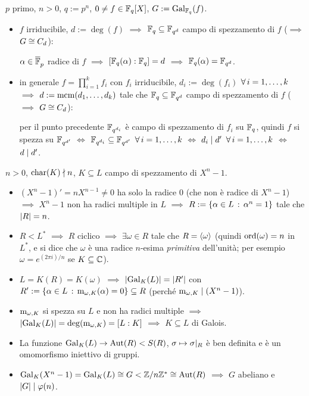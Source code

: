 $p$ primo, $n>0$, $q:=p^n$, $0\ne f\in\F_q[X]$, $G:=\Gal[\F_q]{f}$.
\begin{itemize}
\item $f$ irriducibile, $d:=\deg(f)$ $\implies$ $\F_q\subseteq\F_{q^d}$ campo di spezzamento di $f$ ($\implies$ $G\iso C_d$):

$\alpha\in\calg{\F}_p$ radice di $f$ $\implies$ $[\F_q(\alpha):\F_q]=d$ $\implies$ $\F_q(\alpha)=\F_{q^d}$.
\item in generale $f=\prod_{i=1}^kf_i$ con $f_i$ irriducibile, $d_i:=\deg(f_i)$ $\all i=1,\dots,k$ $\implies$ $d:=\mcm(d_1,\dots,d_k)$ tale che $\F_q\subseteq\F_{q^d}$ campo di spezzamento di $f$ ($\implies$ $G\iso C_d$):

per il punto precedente $\F_{q^{d_i}}$ è campo di spezzamento di $f_i$ su $\F_q$, quindi $f$ si spezza su $\F_{q^{d'}}$ $\iff$ $\F_{q^{d_i}}\subseteq\F_{q^{d'}}$ $\all i=1,\dots,k$ $\iff$ $d_i\dvd d'$ $\all i=1,\dots,k$ $\iff$ $d\dvd d'$.
\end{itemize}




$n>0$, $\car(K)\ndvd n$, $K\subseteq L$ campo di spezzamento di $X^n-1$.
\begin{itemize}
\item $(X^n-1)'=nX^{n-1}\ne0$ ha solo la radice $0$ (che non è radice di $X^n-1$) $\implies$ $X^n-1$ non ha radici multiple in $L$ $\implies$ $R:=\{\alpha\in L\st\alpha^n=1\}$ tale che $\card{R}=n$.
\item $R<L^*$ $\implies$ $R$ ciclico $\implies$ $\exi\omega\in R$ tale che $R=\gen{\omega}$ (quindi $\ord(\omega)=n$ in $L^*$, e si dice che $\omega$ è una radice $n$-esima {\em primitiva} dell'unit\`a; per esempio $\omega=e^{(2\pi i)/n}$ se $K\subseteq\C$).
\item $L=K(R)=K(\omega)$ $\implies$ $\card{\Gal[K]{L}}=\card{R'}$ con $R':=\{\alpha\in L\st\polmin_{\omega,K}(\alpha)=0\}\subseteq R$ (perché $\polmin_{\omega,K}\dvd(X^n-1)$).
\item $\polmin_{\omega,K}$ si spezza su $L$ e non ha radici multiple $\implies$ $\card{\Gal[K]{L}}=\deg(\polmin_{\omega,K})=[L:K]$ $\implies$ $K\subseteq L$ di Galois.
\item La funzione $\Gal[K]{L}\to\Aut(R)<S(R)$, $\sigma\mapsto\sigma\rest{R}$ è ben definita e è un omomorfismo iniettivo di gruppi.
\item $\Gal[K]{X^n-1}=\Gal[K]{L}\iso G<\Z/n\Z^*\iso\Aut(R)$ $\implies$ $G$ abeliano e $\card{G}\dvd\varphi(n)$.
\end{itemize}



